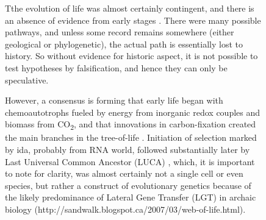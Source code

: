 \begin{figure}
\begin{framed}


Tthe evolution of life was almost certainly contingent, and there is an absence of evidence from early stages \autocite{Pross2013}. There were many possible pathways, and unless some record remains somewhere (either geological or phylogenetic), the actual path is essentially lost to history. So without evidence for historic aspect, it is not possible to test hypotheses by falsification, and hence they can only be speculative.

However, a consensus is forming that early life began with chemoautotrophs fueled by energy from inorganic redox couples and biomass from CO\textsubscript{2}, and that innovations in carbon-fixation created the main branches in the tree-of-life \autocite{Braakman2012}. Initiation of selection marked by \gls{ida}, probably from RNA world, followed substantially later by Last Universal Common Ancestor (LUCA) \autocite{Yarus2011}, which, it is important to note for clarity, was almost certainly not a single cell or even species, but rather a construct of evolutionary genetics because of the likely predominance of Lateral Gene Transfer (LGT) in archaic biology (http://sandwalk.blogspot.ca/2007/03/web-of-life.html).


\end{framed}
\end{figure}
